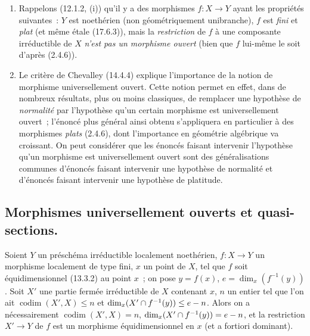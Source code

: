 \begin{remarks}[14.4.10]
\begin{enumerate}[label=(\roman*)]
  Rappelons toutefois (12.1.1.5) que si $Y$ est localement noethérien, $f:X\to Y$
  de type fini et \emph{plat}, alors toute composante irréductible de $X$ est
  \emph{équidimensionnelle} sur $Y$ (et par suite la restriction de $f$ à une telle
  composante est \emph{universellement ouverte} si tous les points de $Y$ sont
  \emph{géométriquement unibranches}).

  \item Rappelons (12.1.2, (i)) qu'il y a des morphismes $f:X\to Y$ ayant les
  propriétés suivantes~: $Y$ est noethérien (non géométriquement unibranche), $f$
  est \emph{fini} et \emph{plat} (et même étale (17.6.3)), mais la \emph{restriction} de $f$ à une
  composante irréductible de $X$ \emph{n'est pas un morphisme ouvert} (bien que $f$
  lui-même le soit d'après (2.4.6)).

  \item Le critère de Chevalley (14.4.4) explique l'importance de la notion de
  morphisme universellement ouvert. Cette notion permet en effet, dans de nombreux
  résultats, plus ou moins classiques, de remplacer une hypothèse de \emph{normalité}
  par l'hypothèse qu'un certain morphisme est universellement ouvert~; l'énoncé plus
  général
  ainsi obtenu s'appliquera en particulier à des morphismes \emph{plats} (2.4.6),
  dont l'importance en géométrie algébrique va croissant. On peut considérer que
  les énoncés faisant intervenir l'hypothèse qu'un morphisme est universellement
  ouvert sont des généralisations communes d'énoncés faisant intervenir une
  hypothèse de normalité et d'énoncés faisant intervenir une hypothèse de platitude.
\end{enumerate}
\end{remarks}

\subsection{Morphismes universellement ouverts et quasi-sections.}
\label{subsection:IV.14.5-fr}

\begin{lemma}[14.5.1]
\label{IV.14.5.1-fr}
Soient $Y$ un préschéma irréductible localement noethérien, $f:X\to Y$ un
morphisme localement de type fini, $x$ un point de $X$, tel que $f$ soit
équidimensionnel \textup{(13.3.2)} au point $x$~; on pose $y=f(x)$,
$e=\dim_x(f^{-1}(y))$. Soit $X'$ une partie fermée irréductible de $X$ contenant
$x$, $n$ un entier tel que l'on ait $\operatorname{codim}(X',X)\leq n$ et
$\dim_x(X'\cap f^{-1}(y))\leq e- n$. Alors on a nécessairement
$\operatorname{codim}(X',X)=n$, $\dim_x(X'\cap f^{-1}(y))=e- n$, et la restriction $X'\to Y$
de $f$ est un morphisme équidimensionnel en $x$ (et \textup{a fortiori} dominant).
\end{lemma}


